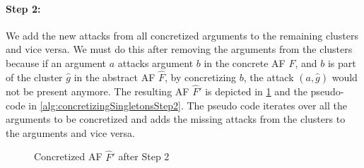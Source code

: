 \paragraph{Step 2:} We add the new attacks from all concretized arguments to the remaining clusters and vice versa. We must do this after removing the arguments from the clusters because if an argument $a$ attacks argument $b$ in the concrete AF $F$, and $b$ is part of the cluster $\hat{g}$ in the abstract AF $\hat{F}$, by concretizing $b$, the attack $(a,\hat{g})$ would not be present anymore. The resulting AF $\hat{F}'$ is depicted in \cref{example:algorithmConcretizeSingletonsStep2} and the pseudo-code in \cref{alg:concretizingSingletonsStep2}. The pseudo code iterates over all the arguments to be concretized and adds the missing attacks from the clusters to the arguments and vice versa.


\vspace{0.3cm}
\begin{figure}[h]
    \centering
    \caption{Concretized AF $\hat{F}'$ after Step 2}
    \label{example:algorithmConcretizeSingletonsStep2}
\end{figure}
\vspace{-0.2cm}



